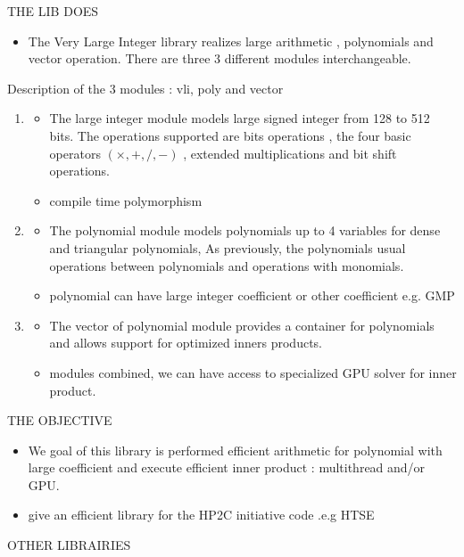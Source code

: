 \documentclass[oribibl]{llncs2e/llncs}
\begin{document}
 THE LIB DOES
\begin{itemize}
\item The Very Large Integer library realizes large arithmetic , polynomials  and vector operation.  There are three 3 different modules interchangeable. 
\end{itemize}
Description of the 3 modules : vli, poly and vector
\begin{enumerate}
\item  \begin{itemize}
\item The large integer module models large signed integer from 128 to 512 bits. The operations supported are bits operations , the four basic operators $(\times,+,/,-)$ , extended multiplications and bit shift operations. 
\item compile time polymorphism
\end{itemize}
\item \begin{itemize}
\item The polynomial module models polynomials up to 4 variables for dense and triangular polynomials, As previously, the polynomials usual  operations between polynomials and operations with monomials.  
\item polynomial can have large integer coefficient or other coefficient e.g. GMP
\end{itemize}

\item \begin{itemize}
\item The vector of polynomial module provides a container for polynomials and allows support for optimized inners products.
\item  modules combined, we can have access to specialized GPU solver for inner product.
\end{itemize}
\end{enumerate}


THE OBJECTIVE

\begin{itemize}
\item  We goal of this library is performed efficient arithmetic for polynomial with large coefficient and execute efficient inner product : multithread and/or GPU.
\item give an efficient library for the HP2C initiative code .e.g  HTSE
\end{itemize}

OTHER LIBRAIRIES
\end{document}
